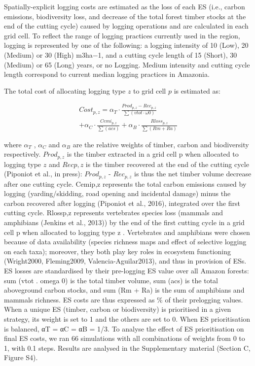 \documentclass{article}
\begin{document}
Spatially-explicit logging costs are estimated as the loss of each ES (i.e., carbon emissions, biodiversity loss, and decrease of the total forest timber stocks at the end of the cutting cycle) caused by logging operations and are calculated in each grid cell. To reflect the range of logging practices currently used in the region, logging is represented by one of the following: a logging intensity of 10 (Low), 20 (Medium) or 30 (High) m3ha−1, and a cutting cycle length of 15 (Short), 30 (Medium) or 65 (Long) years, or no Logging. Medium intensity and cutting cycle length correspond to current median logging practices in Amazonia.

The total cost of allocating logging type $z$ to grid cell $p$ is estimated as: 

\begin{equation}
\begin{split}
    Cost_{p,z} = \alpha _T \cdot \frac{Prod_{p,z} - Rec_{p,z}}{\sum(vtot\cdot \omega 0)} \\+ \alpha _C \cdot \frac{Cemi_{p,z}}{\sum (acs) }  + \alpha _B \cdot \frac{Rloss_{p,z}}{\sum (Rm + Ra)}   
\end{split}
\end{equation}

where $\alpha_T$ ,  $\alpha_C$  and  $\alpha_B$  are the relative weights of timber, carbon and biodiversity respectively. $Prod_{p,z}$  is the timber extracted in a grid cell  p  when allocated to logging type $z$ and $Recp,z$ is the timber recovered at the end of the cutting cycle (Piponiot et al., in press):  $Prod_{p,z}$ - $Rec_{p,z}$  is thus the net timber volume decrease after one cutting cycle. Cemip,z  represents the total carbon emissions caused by logging (yarding/skidding, road opening and incidental damage) minus the carbon recovered after logging (Piponiot et al., 2016), integrated over the first cutting cycle.  Rlossp,z  represents vertebrates species loss (mammals and amphibians (Jenkins et al., 2013)) by the end of the first cutting cycle in a grid cell  p  when allocated to logging type  z . Vertebrates and amphibians were chosen because of data availability (species richness maps and effect of selective logging on each taxa); moreover, they both play key roles in ecosystem functioning (Wright2000, Fleming2009, Valencia-Aguilar2013), and thus in provision of ESs.  
ES losses are standardised by their pre-logging ES value over all Amazon forests: sum (vtot . omega 0) is the total timber volume, sum (acs) is the total aboveground carbon stocks, and sum (Rm + Ra) is the sum of amphibians and mammals richness. ES costs are thus expressed as \% of their prelogging values. 
When a unique ES (timber, carbon or biodiversity) is prioritised in a given strategy, its weight is set to 1 and the others are set to 0. When ES prioritisation is balanced, αT = αC = αB = 1/3.
To analyse the effect of ES prioritisation on final ES costs, we ran 66 simulations with all combinations of weights from 0 to 1, with 0.1 steps. Results are analysed in the Supplementary material (Section C, Figure S4).  
\end{document}
